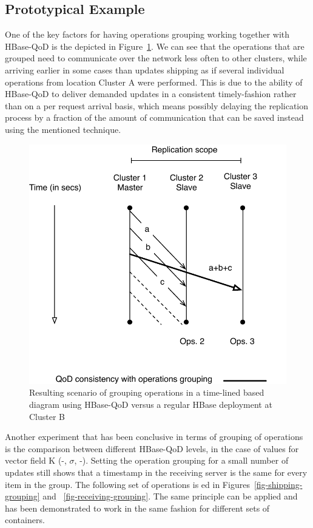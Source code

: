 \subsection{Prototypical Example}
One of the key factors for having operations grouping working together with HBase-QoD is the depicted in Figure~\ref{fig-qod-grouping}. We can see that the operations that are grouped need to communicate over the network less often to other clusters, while arriving earlier in some cases than updates shipping as if several individual operations from location Cluster A were performed. This is due to the ability of HBase-QoD to deliver demanded updates in a consistent timely-fashion rather than on a per request arrival basis, which means possibly delaying the replication process by a fraction of the amount of communication that can be saved instead using the mentioned technique.

\begin{figure}
\centering
\includegraphics[scale=0.6]{figs/operation-grouping.pdf}
\caption{Resulting scenario of grouping operations in a time-lined based diagram using HBase-QoD versus a regular HBase deployment at Cluster B}
\label{fig-qod-grouping}
\end{figure}

Another experiment that has been conclusive in terms of grouping of operations is the comparison between different HBase-QoD levels, in the case of values for vector field K (-, $\sigma$, -). Setting the operation grouping for a small number of updates still shows that a timestamp in the receiving server is the same for every item in the group. The following set of operations is ed in Figures~\ref{fig-shipping-grouping} and ~\ref{fig-receiving-grouping}. The same principle can be applied and has been demonstrated to work in the same fashion for different sets of containers.

